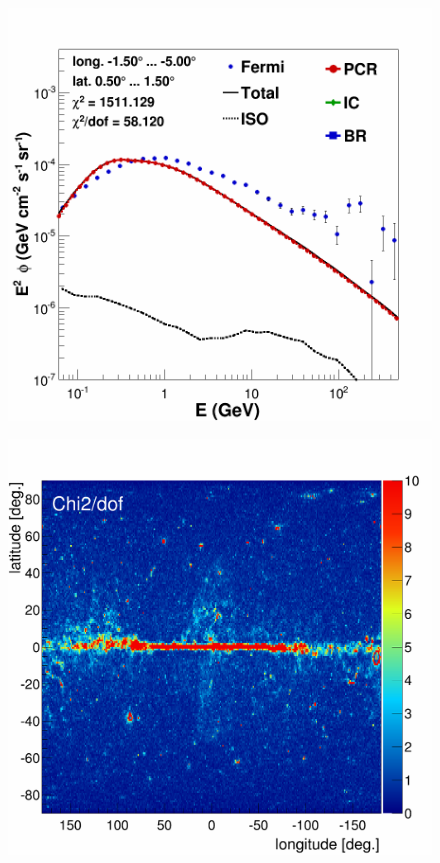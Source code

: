 \begin{figure}[h]
  \centering
  \begin{minipage}[h]{0.45\textwidth}
  	\centering
	\includegraphics[width=1.\linewidth]{pic/results/BKGonly_CMZ.png}
  	\subcaption{}
  	\label{fig:bkgd_only_spectrum}
  \end{minipage}
  \hfill
  \begin{minipage}[h]{0.45\textwidth}
	  \centering
	  \includegraphics[width=1.\linewidth]{pic/results/BKGonly_fine_chi2_distribution.png}

\end{minipage}
\end{figure}
